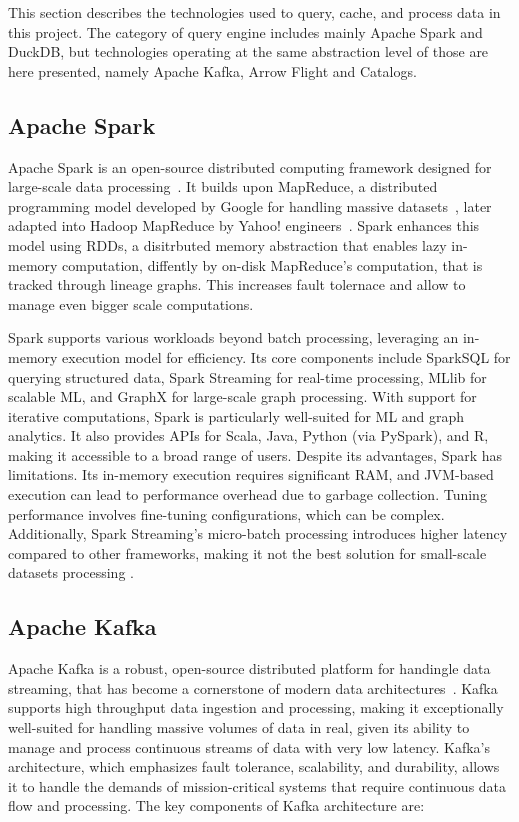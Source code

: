 This section describes the technologies used to query, cache, and process data in this project. The category of query engine includes mainly Apache Spark and DuckDB, but technologies operating at the same abstraction level of those are here presented, namely Apache Kafka, Arrow Flight and Catalogs.

\subsection{Apache Spark}
Apache Spark is an open-source distributed computing framework designed for large-scale data processing~\cite{zahariaApacheSparkUnified2016}. It builds upon MapReduce, a distributed programming model developed by Google for handling massive datasets~\cite{dean2004mapreduce}, later adapted into Hadoop MapReduce by Yahoo! engineers~\cite{borthakurHadoopDistributedFile2005}. Spark enhances this model using \glspl{RDD}\cite{Zaharia:EECS-2011-82}, a disitrbuted memory abstraction that enables lazy in-memory computation, diffently by on-disk MapReduce's computation, that is tracked through lineage graphs. This increases fault tolernace \cite{Zaharia:EECS-2011-82} and allow to manage even bigger scale computations.

Spark supports various workloads beyond batch processing, leveraging an in-memory execution model for efficiency. Its core components include SparkSQL for querying structured data, Spark Streaming for real-time processing, MLlib for scalable \gls{ML}, and GraphX for large-scale graph processing. With support for iterative computations, Spark is particularly well-suited for \gls{ML} and graph analytics. It also provides \glspl{API} for Scala, Java, Python (via PySpark), and R, making it accessible to a broad range of users. Despite its advantages, Spark has limitations. Its in-memory execution requires significant RAM, and \gls{JVM}-based execution can lead to performance overhead due to garbage collection. Tuning performance involves fine-tuning configurations, which can be complex. Additionally, Spark Streaming's micro-batch processing introduces higher latency compared to other frameworks, making it not the best solution for small-scale datasets processing \cite{BenchmarkResultsSpark}.

\subsection{Apache Kafka}

Apache Kafka is a robust, open-source distributed platform for handingle data streaming, that has become a cornerstone of modern data architectures~\cite{krepsKafkaDistributedMessaging2011}. Kafka supports high throughput data ingestion and processing, making it exceptionally well-suited for handling massive volumes of data in real, given its ability to manage and process continuous streams of data with very low latency. Kafka's architecture, which emphasizes fault tolerance, scalability, and durability, allows it to handle the demands of mission-critical systems that require continuous data flow and processing.  The key components of Kafka architecture are:

